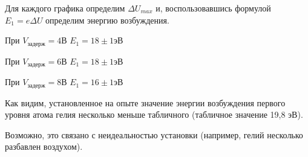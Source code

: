 \documentclass[12pt]{article}
\begin{document}
    Для каждого графика определим $\Delta U_{max}$ и, воспользовавшись формулой $E_1 = e\Delta U$ определим энергию возбуждения.
    
    При $V_{задерж} = 4В$ $E_1 = 18 \pm 1 эВ$
    
    При $V_{задерж} = 6В$ $E_1 = 18 \pm 1 эВ$
    
    При $V_{задерж} = 8В$ $E_1 = 16 \pm 1 эВ$
    
    Как видим, установленное на опыте значение энергии возбуждения первого уровня атома гелия несколько меньше табличного (табличное значение 19,8 эВ).
    
    Возможно, это связано с неидеальностью установки (например, гелий несколько разбавлен воздухом).
    
\end{document}
